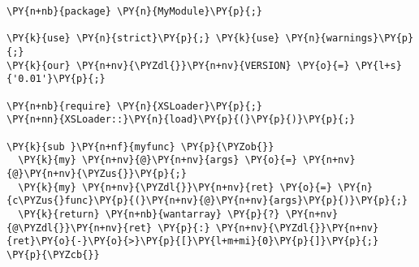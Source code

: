 \begin{Verbatim}[commandchars=\\\{\}]
\PY{n+nb}{package} \PY{n}{MyModule}\PY{p}{;}

\PY{k}{use} \PY{n}{strict}\PY{p}{;} \PY{k}{use} \PY{n}{warnings}\PY{p}{;}
\PY{k}{our} \PY{n+nv}{\PYZdl{}}\PY{n+nv}{VERSION} \PY{o}{=} \PY{l+s}{'0.01'}\PY{p}{;}

\PY{n+nb}{require} \PY{n}{XSLoader}\PY{p}{;}
\PY{n+nn}{XSLoader::}\PY{n}{load}\PY{p}{(}\PY{p}{)}\PY{p}{;}

\PY{k}{sub }\PY{n+nf}{myfunc} \PY{p}{\PYZob{}}
  \PY{k}{my} \PY{n+nv}{@}\PY{n+nv}{args} \PY{o}{=} \PY{n+nv}{@}\PY{n+nv}{\PYZus{}}\PY{p}{;}
  \PY{k}{my} \PY{n+nv}{\PYZdl{}}\PY{n+nv}{ret} \PY{o}{=} \PY{n}{c\PYZus{}func}\PY{p}{(}\PY{n+nv}{@}\PY{n+nv}{args}\PY{p}{)}\PY{p}{;}
  \PY{k}{return} \PY{n+nb}{wantarray} \PY{p}{?} \PY{n+nv}{@\PYZdl{}}\PY{n+nv}{ret} \PY{p}{:} \PY{n+nv}{\PYZdl{}}\PY{n+nv}{ret}\PY{o}{-}\PY{o}{>}\PY{p}{[}\PY{l+m+mi}{0}\PY{p}{]}\PY{p}{;}
\PY{p}{\PYZcb{}}
\end{Verbatim}
